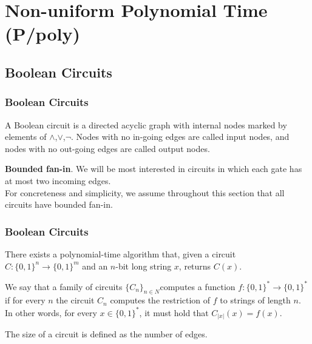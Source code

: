 \documentclass{beamer}
\begin{document}
\section{Non-uniform Polynomial Time (P/poly)} %

\subsection{Boolean Circuits} %

\begin{frame}
\frametitle{Boolean Circuits}
\begin{definition}
	A Boolean circuit is a directed acyclic graph with internal nodes marked by elements of {$\land$,$\lor$,$\lnot$}. Nodes with no in-going edges are called input nodes, and nodes with no out-going edges are called output nodes.
\end{definition}
{\bfseries Bounded fan-in}. We will be most interested in circuits in which each gate has at most two incoming edges.\\
For concreteness and simplicity, we assume throughout this section that all circuits have bounded fan-in.
\end{frame}


\begin{frame}
\frametitle{Boolean Circuits}
\begin{theorem}
There exists a polynomial-time algorithm that, given a circuit $C: \{0,1\}^{n} \rightarrow \{0,1\}^{m}$ and an $n$-bit long string $x$, returns $C(x)$.
\end{theorem}
\begin{definition}
We say that a family of circuits $\{C_{n}\}_{n \in N}$computes a function $f: \{0,1\}^{*} \rightarrow \{0,1\}^{*}$ if for every $n$ the circuit $C_{n}$ computes the restriction of $f$ to strings of length $n$. In other words, for every $x \in \{0,1\}^{*}$, it must hold that $C_{|x|}(x)=f(x)$.
\end{definition}
The size of a circuit is defined as the number of edges.
\end{frame}
\end{document}
